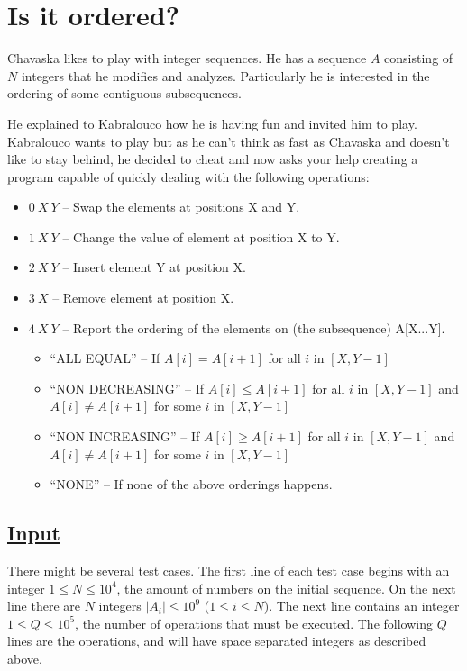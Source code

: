 \documentclass[12pt]{article}
\begin{document}
\pagestyle{empty}

\section*{Is it ordered?}
Chavaska likes to play with integer sequences. He has a sequence $A$ consisting of $N$ integers that he modifies and analyzes. Particularly he is interested in the ordering of some contiguous subsequences.

He explained to Kabralouco how he is having fun and invited him to play. Kabralouco wants to play but as he can't think as fast as Chavaska and doesn't like to stay behind, he decided to cheat and now asks your help creating a program capable of quickly dealing with the following operations:

\begin{itemize}
\item $0\ X\ Y$ -- Swap the elements at positions X and Y.
\item $1\ X\ Y$ -- Change the value of element at position X to Y.
\item $2\ X\ Y$ -- Insert element Y at position X.
\item $3\ X$ -- Remove element at position X.
\item $4\ X\ Y$ -- Report the ordering of the elements on (the subsequence) A[X...Y].
\begin{itemize}
	\item ``ALL EQUAL'' -- If $A[i] = A[i+1]$ for all $i$ in $[X, Y-1]$
	\item ``NON DECREASING'' -- If $A[i] \leq A[i+1]$ for all $i$ in $[X,Y-1]$ and $A[i] \neq A[i+1]$ for some $i$ in $[X,Y-1]$
	\item ``NON INCREASING'' -- If $A[i] \geq A[i+1]$ for all $i$ in $[X,Y-1]$ and $A[i] \neq A[i+1]$ for some $i$ in $[X,Y-1]$
	\item ``NONE'' -- If none of the above orderings happens.
\end{itemize}
\end{itemize}

\subsection*{\underline{Input}}
There might be several test cases. The first line of each test case begins with an integer $1 \leq N \leq 10^4$, the amount of numbers on the initial sequence.
On the next line there are $N$ integers $|A_i| \leq 10^9$ ($1 \leq i \leq N$).
The next line contains an integer $1 \leq Q \leq 10^5$, the number of operations that must be executed.
The following $Q$ lines are the operations, and will have space separated integers as described above. 
\end{document}
